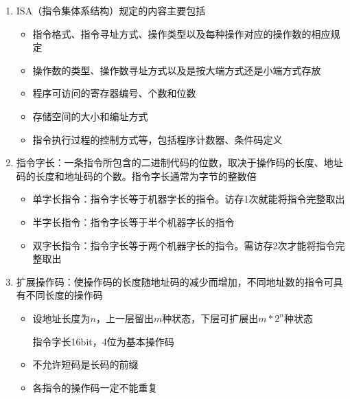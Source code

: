 \documentclass[a4paper,12pt]{article}
\begin{document}
    \begin{enumerate}
        \item ISA（指令集体系结构）规定的内容主要包括
        \begin{itemize}
            \item 指令格式、指令寻址方式、操作类型以及每种操作对应的操作数的相应规定
            \item 操作数的类型、操作数寻址方式以及是按大端方式还是小端方式存放
            \item 程序可访问的寄存器编号、个数和位数
            \item 存储空间的大小和编址方式
            \item 指令执行过程的控制方式等，包括程序计数器、条件码定义
        \end{itemize}
        \item 指令字长：一条指令所包含的二进制代码的位数，取决于操作码的长度、地址码的长度和地址码的个数。指令字长通常为字节的整数倍
        \begin{itemize}
            \item 单字长指令：指令字长等于机器字长的指令。访存1次就能将指令完整取出
            \item 半字长指令：指令字长等于半个机器字长的指令
            \item 双字长指令：指令字长等于两个机器字长的指令。需访存2次才能将指令完整取出
        \end{itemize}
        \item 扩展操作码：使操作码的长度随地址码的减少而增加，不同地址数的指令可具有不同长度的操作码
        \begin{itemize}
            \item 设地址长度为$n$，上一层留出$m$种状态，下层可扩展出$m * 2^n$种状态
            \begin{analysisbox}
                指令字长16bit，4位为基本操作码
            \end{analysisbox}
            \item 不允许短码是长码的前缀
            \item 各指令的操作码一定不能重复
        \end{itemize}
    \end{enumerate}
\end{document}
